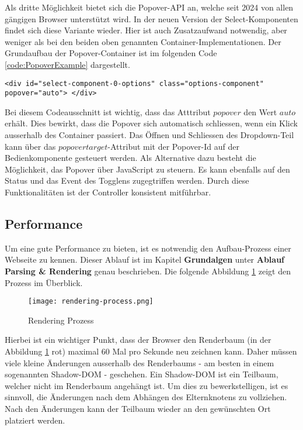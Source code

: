 Als dritte Möglichkeit bietet sich die Popover-API an, welche seit 2024 von allen gängigen Browser unterstützt wird.
In der neuen Version der Select-Komponenten findet sich diese Variante wieder.
Hier ist auch Zusatzaufwand notwendig, aber weniger als bei den beiden oben genannten Container-Implementationen.
Der Grundaufbau der Popover-Container ist im folgenden Code \ref{code:PopoverExample} dargestellt.

\begin{lstlisting}[language = html5, caption = Popover-Container Beispiel, label = code:PopoverExample]
<div id="select-component-0-options" class="options-component" popover="auto"> </div>
\end{lstlisting}

Bei diesem Codeausschnitt ist wichtig, dass das Atttribut $popover$ den Wert $auto$ erhält.
Dies bewirkt, dass die Popover sich automatisch schliessen, wenn ein Klick ausserhalb des Container passiert.
Das Öffnen und Schliessen des Dropdown-Teil kann über das $popovertarget$-Attribut mit der Popover-Id auf der Bedienkomponente gesteuert werden.
Als Alternative dazu besteht die Möglichkeit, das Popover über JavaScript zu steuern.
Es kann ebenfalls auf den Status und das Event des Togglens zugegtriffen werden.
Durch diese Funktionalitäten ist der Controller konsistent mitführbar.


\subsection{Performance}

Um eine gute Performance zu bieten, ist es notwendig den Aufbau-Prozess einer Webseite zu kennen.
Dieser Ablauf ist im Kapitel \textbf{Grundalgen} unter \textbf{Ablauf Parsing \& Rendering} genau beschrieben.
Die folgende Abbildung \ref{Abbildung:RenderingProcessRecap} zeigt den Prozess im Überblick.

\begin{figure}[!htb]
    \centering
    \texttt{[image: rendering-process.png]}
    \caption{Rendering Prozess}
    \label{Abbildung:RenderingProcessRecap}
\end{figure}

Hierbei ist ein wichtiger Punkt, dass der Browser den Renderbaum (in der Abbildung \ref{Abbildung:RenderingProcessRecap} rot) maximal 60 Mal pro Sekunde neu zeichnen kann.
Daher müssen viele kleine Änderungen ausserhalb des Renderbaums - am besten in einem sogenannten Shadow-DOM - geschehen.
Ein Shadow-DOM ist ein Teilbaum, welcher nicht im Renderbaum angehängt ist.
Um dies zu bewerkstelligen, ist es sinnvoll, die Änderungen nach dem Abhängen des Elternknotens zu vollziehen. 
Nach den Änderungen kann der Teilbaum wieder an den gewünschten Ort platziert werden.

